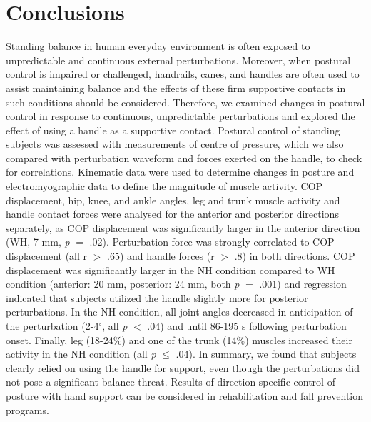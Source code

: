 \section{Conclusions}
Standing balance in human everyday environment is often exposed to unpredictable and continuous external perturbations. Moreover, when postural control is impaired or challenged, handrails, canes, and handles are often used to assist maintaining balance and the effects of these firm supportive contacts in such conditions should be considered.
Therefore, we examined changes in postural control in response to continuous, unpredictable perturbations and explored the effect of using a handle as a supportive contact. Postural control of standing subjects was assessed with measurements of centre of pressure, which we also compared with perturbation waveform and forces exerted on the handle, to check for correlations. Kinematic data were used to determine changes in posture and electromyographic data to define the magnitude of muscle activity.
COP displacement, hip, knee, and ankle angles, leg and trunk muscle activity and handle contact forces were analysed for the anterior and posterior directions separately, as COP displacement was significantly larger in the anterior direction (WH, 7 mm, \textit{p} $=$ .02). Perturbation force was strongly correlated to COP displacement (all r $>$ .65) and handle forces (r $>$ .8) in both directions. COP displacement was significantly larger in the NH condition compared to WH condition (anterior: 20 mm, posterior: 24 mm, both \textit{p} $=$ .001) and regression indicated that subjects utilized the handle slightly more for posterior perturbations. In the NH condition, all joint angles decreased in anticipation of the perturbation (2-4$^{\circ}$, all \textit{p} $<$ .04) and until 86-195 s following perturbation onset. Finally, leg (18-24\%) and one of the trunk (14\%) muscles increased their activity in the NH condition (all \textit{p} $\leqslant$ .04). 
In summary, we found that subjects clearly relied on using the handle for support, even though the perturbations did not pose a significant balance threat. Results of direction specific control of posture with hand support can be considered in rehabilitation and fall prevention programs.
